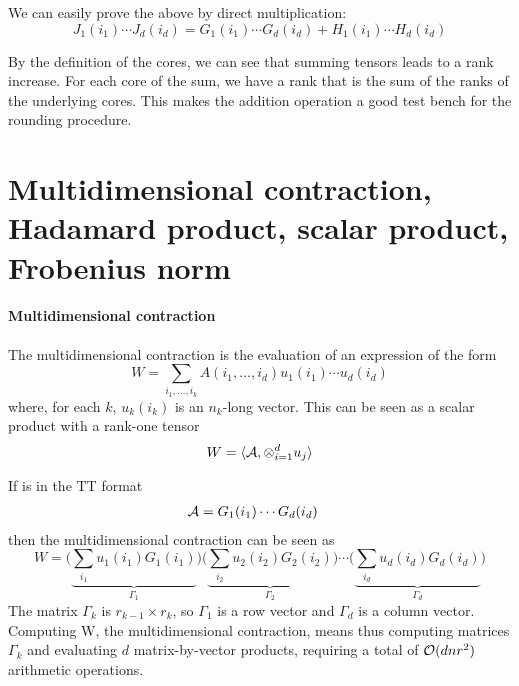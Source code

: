 We can easily prove the above by direct multiplication:
\begin{equation*}
  J_1(i_1) \cdots J_d(i_d) = G_1(i_1) \cdots G_d(i_d) + H_1(i_1) \cdots H_d(i_d)
\end{equation*}

By the definition of the cores, we can see that summing tensors leads to a rank increase. For each core of the sum, we have a rank that is the sum of the ranks of the underlying cores. This makes the addition operation a good test bench for the rounding procedure.

\section[Contraction, products and norm]{Multidimensional contraction, Hadamard product, scalar product, Frobenius norm}
\paragraph{Multidimensional contraction}
The multidimensional contraction is the evaluation of an expression of the form
\begin{equation*}
  W = \sum_{i_1,\ldots,i_k} A(i_1,\ldots,i_d) u_1(i_1) \cdots u_d(i_d)
\end{equation*}
where, for each $k$, $u_k(i_k)$ is an $n_k$-long vector. This can be seen as a scalar product with a rank-one tensor
\begin{equation*}
  W = \langle \mathcal{A}, \otimes_{i=1}^d u_j \rangle
\end{equation*}

If \A is in the TT format
\begin{equation*}
  \begin{split}
    \mathcal{A} &= G_1(i_1) \cdots G_d(i_d)
  \end{split}
\end{equation*}
then the multidimensional contraction can be seen as
\begin{equation*}
  W = \Bigg( \underbrace{\sum_{i_1} u_1(i_1)G_1(i_1)}_{\Gamma_1} \Bigg) \Bigg( \underbrace{ \sum_{i_2} u_2(i_2)G_2(i_2)}_{\Gamma_2} \Bigg) \cdots \Bigg( \underbrace{\sum_{i_d} u_d(i_d)G_d(i_d)}_{\Gamma_d} \Bigg)
\end{equation*}
The matrix $\Gamma_k$ is $r_{k-1} \times r_k$, so $\Gamma_1$ is a row vector and $\Gamma_d$ is a column vector. Computing W, the multidimensional contraction, means thus computing matrices $\Gamma_k$ and evaluating $d$ matrix-by-vector products, requiring a total of $\mathcal{O}(dnr^2)$ arithmetic operations.

